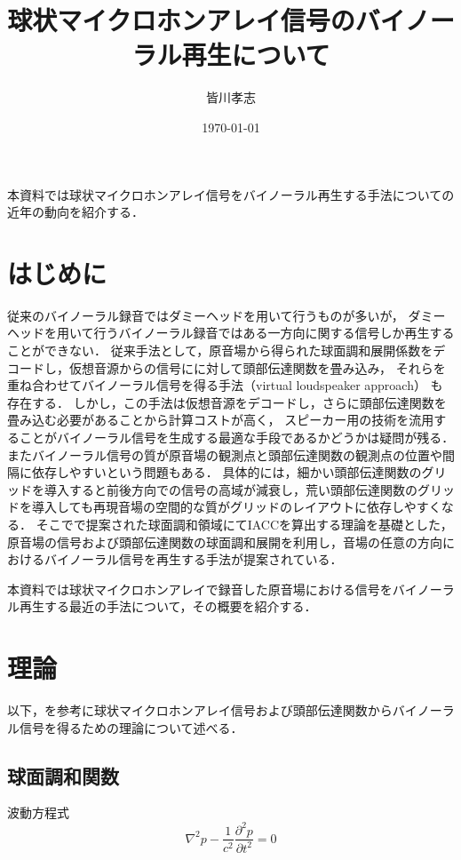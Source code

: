 \documentclass[a4paper]{jsarticle}
\begin{document}
\title{球状マイクロホンアレイ信号のバイノーラル再生について}
\author{皆川孝志}
\date{\today}
\maketitle

本資料では球状マイクロホンアレイ信号をバイノーラル再生する手法についての近年の動向を紹介する．

\section{はじめに}
従来のバイノーラル録音ではダミーヘッドを用いて行うものが多いが，
ダミーヘッドを用いて行うバイノーラル録音ではある一方向に関する信号しか再生することができない\cite{Andersson_undated-qg}．
従来手法として，原音場から得られた球面調和展開係数をデコードし，仮想音源からの信号にに対して頭部伝達関数を畳み込み，
それらを重ね合わせてバイノーラル信号を得る手法\cite{Jot1999-bt, Noisternig2003-ug}（virtual loudspeaker approach）
も存在する．
しかし，この手法は仮想音源をデコードし，さらに頭部伝達関数を畳み込む必要があることから計算コストが高く，
スピーカー用の技術を流用することがバイノーラル信号を生成する最適な手段であるかどうかは疑問が残る\cite{Schorkhuber2018-ql}．
またバイノーラル信号の質が原音場の観測点と頭部伝達関数の観測点の位置や間隔に依存しやすいという問題もある．
具体的には，細かい頭部伝達関数のグリッドを導入すると前後方向での信号の高域が減衰し，荒い頭部伝達関数のグリッドを導入しても再現音場の空間的な質がグリッドのレイアウトに依存しやすくなる\cite{Zotter2019-ix}．
そこで\cite{Rafaely2010-ea}で提案された球面調和領域にてIACCを算出する理論を基礎とした，原音場の信号および頭部伝達関数の球面調和展開を利用し，音場の任意の方向におけるバイノーラル信号を再生する手法が提案されている\cite{Andersson_undated-qg, Ben-Hur2017-gm, Bernschutz2016-be,Otani2020-cg,Schorkhuber2018-ql, Sheaffer2014-bo, Zaunschirm2018-mn}．

本資料では球状マイクロホンアレイで録音した原音場における信号をバイノーラル再生する最近の手法について，その概要を紹介する．

\section{理論}
以下，\cite{Andersson_undated-qg}を参考に球状マイクロホンアレイ信号および頭部伝達関数からバイノーラル信号を得るための理論について述べる．

\subsection{球面調和関数}
波動方程式
\begin{equation}
    \label{wave-equation}
    \nabla^{2} p-\frac{1}{c^{2}} \frac{\partial^{2} p}{\partial t^{2}}=0
\end{equation}
\end{document}
